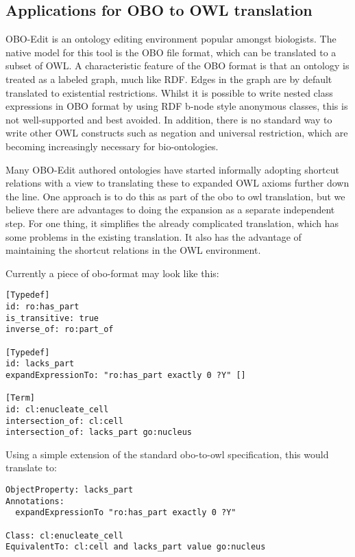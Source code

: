 \documentclass{llncs}
\begin{document}

\subsection{Applications for OBO to OWL translation}

OBO-Edit is an ontology editing environment popular amongst
biologists\cite{Day-Richter2007}. The native model for this tool is
the OBO file format, which can be translated to a subset of
OWL\cite{golbreich2007obo}\cite{tirmizi2009}. A characteristic feature
of the OBO format is that an ontology is treated as a labeled graph,
much like RDF. Edges in the graph are by default translated to
existential restrictions. Whilst it is possible to write nested class
expressions in OBO format by using RDF b-node style anonymous classes,
this is not well-supported and best avoided. In addition, there is no
standard way to write other OWL constructs such as negation and
universal restriction, which are becoming increasingly necessary for
bio-ontologies.

Many OBO-Edit authored ontologies have started informally adopting
shortcut relations with a view to translating these to expanded OWL
axioms further down the line. One approach is to do this as part of
the obo to owl translation, but we believe there are advantages to
doing the expansion as a separate independent step. For one thing, it
simplifies the already complicated translation, which has some
problems in the existing translation. It also has the advantage of
maintaining the shortcut relations in the OWL environment.

Currently a piece of obo-format may look like this:

\begin{verbatim}
[Typedef]
id: ro:has_part
is_transitive: true
inverse_of: ro:part_of

[Typedef]
id: lacks_part
expandExpressionTo: "ro:has_part exactly 0 ?Y" []

[Term]
id: cl:enucleate_cell
intersection_of: cl:cell
intersection_of: lacks_part go:nucleus
\end{verbatim}

Using a simple extension of the standard obo-to-owl specification, this
would translate to:

\begin{verbatim}
ObjectProperty: lacks_part
Annotations:
  expandExpressionTo "ro:has_part exactly 0 ?Y"

Class: cl:enucleate_cell
EquivalentTo: cl:cell and lacks_part value go:nucleus
\end{verbatim}
\end{document}
